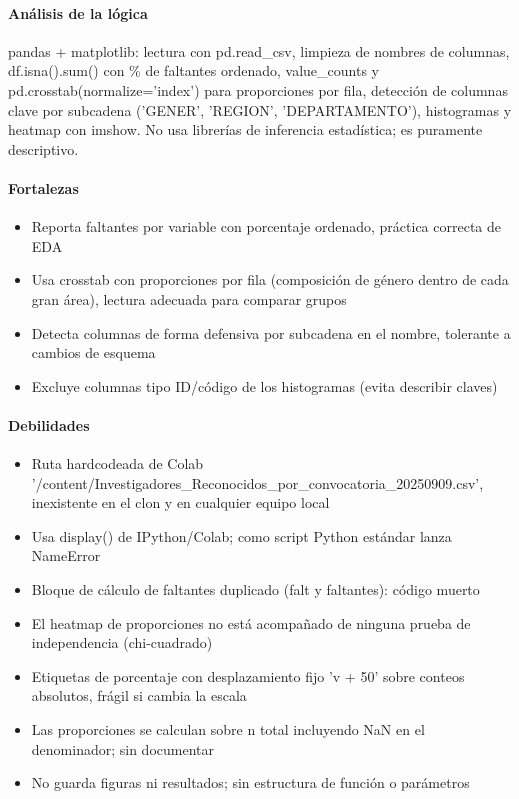 \paragraph{Análisis de la lógica}
pandas + matplotlib: lectura con pd.read\_csv, limpieza de nombres de columnas, df.isna().sum() con \% de faltantes ordenado, value\_counts y pd.crosstab(normalize='index') para proporciones por fila, detección de columnas clave por subcadena ('GENER', 'REGION', 'DEPARTAMENTO'), histogramas y heatmap con imshow. No usa librerías de inferencia estadística; es puramente descriptivo.

\paragraph{Fortalezas}
\begin{itemize}
  \item Reporta faltantes por variable con porcentaje ordenado, práctica correcta de EDA
  \item Usa crosstab con proporciones por fila (composición de género dentro de cada gran área), lectura adecuada para comparar grupos
  \item Detecta columnas de forma defensiva por subcadena en el nombre, tolerante a cambios de esquema
  \item Excluye columnas tipo ID/código de los histogramas (evita describir claves)
\end{itemize}

\paragraph{Debilidades}
\begin{itemize}
  \item Ruta hardcodeada de Colab '/content/Investigadores\_Reconocidos\_por\_convocatoria\_20250909.csv', inexistente en el clon y en cualquier equipo local
  \item Usa display() de IPython/Colab; como script Python estándar lanza NameError
  \item Bloque de cálculo de faltantes duplicado (falt y faltantes): código muerto
  \item El heatmap de proporciones no está acompañado de ninguna prueba de independencia (chi-cuadrado)
  \item Etiquetas de porcentaje con desplazamiento fijo 'v + 50' sobre conteos absolutos, frágil si cambia la escala
  \item Las proporciones se calculan sobre n total incluyendo NaN en el denominador; sin documentar
  \item No guarda figuras ni resultados; sin estructura de función o parámetros
\end{itemize}

